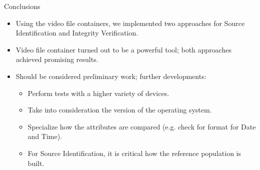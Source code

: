 \begin{tframe}{Conclusions}

\begin{itemize}
\item Using the video file containers, we implemented two approaches for Source Identification and Integrity Verification.
\vspace{0.1cm}
\item Video file container turned out to be a powerful tool; both approaches achieved promising results.
\vspace{0.1cm}
\item Should be considered preliminary work; further developments:
\begin{itemize}
\vspace{0.1cm}
\item Perform tests with a higher variety of devices.
\vspace{0.1cm}
\item Take into consideration the version of the operating system.
\vspace{0.1cm}
\item Specialize how the attributes are compared (e.g. check for format for Date and Time).
\vspace{0.1cm}
\item For Source Identification, it is critical how the reference population is built.
\end{itemize}
\end{itemize}
\end{tframe}
